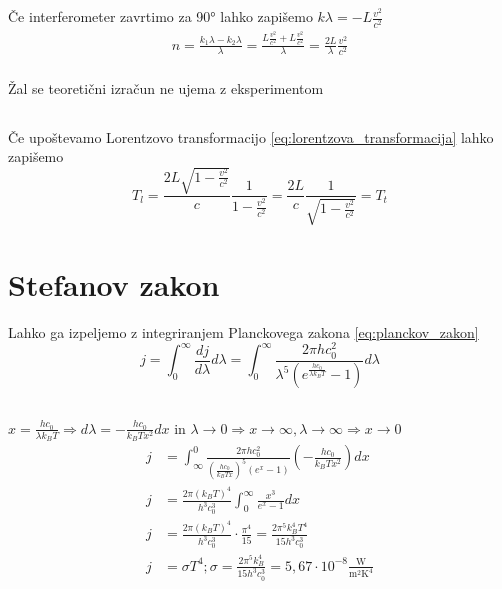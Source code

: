 \documentclass[a4paper,12pt]{article}
\begin{document}
\subsection{}
Če interferometer zavrtimo za 90° lahko zapišemo $k \lambda = -L \frac{v^2}{c^2}$
\begin{align}
    n = \frac{k_1\lambda - k_2\lambda}{\lambda} = \frac{L \frac{v^2}{c^2} + L \frac{v^2}{c^2}}{\lambda} = \frac{2 L}{\lambda} \frac{v^2}{c^2} \\
\end{align}

Žal se teoretični izračun ne ujema z eksperimentom

\subsection{}
Če upoštevamo Lorentzovo transformacijo \ref{eq:lorentzova_transformacija} lahko zapišemo
\begin{equation}
    T_l = \frac{2L\sqrt{1 - \frac{v^2}{c^2}}}{c} \frac{1}{1 - \frac{v^2}{c^2}} = \frac{2L}{c} \frac{1}{\sqrt{1 - \frac{v^2}{c^2}}} = T_t
\end{equation}

\newpage
\section{Stefanov zakon}
Lahko ga izpeljemo z integriranjem Planckovega zakona \ref{eq:planckov_zakon}
\begin{equation}
    j = \int_0^\infty \frac{dj}{d\lambda} d\lambda = \int_0^\infty \frac{2 \pi hc_0^2}{\lambda^5\left(e^{\frac{hc_0}{\lambda k_B T}} - 1\right)} d\lambda
\end{equation}

\subsection{}
$x = \frac{hc_0}{\lambda k_B T} \Rightarrow d\lambda = -\frac{hc_0}{k_B T x^2} dx$ in $\lambda  \to 0 \Rightarrow x \to \infty, \lambda \to \infty \Rightarrow x \to 0$
\begin{align}
    j & = \int_\infty^0 \frac{2 \pi hc_0^2}{\left(\frac{hc_0}{k_B T x}\right)^5 \left(e^x - 1\right)} \left(-\frac{hc_0}{k_B T x^2}\right) dx \\
    j & = \frac{2 \pi (k_B T)^4}{h^3 c_0^3} \int_0^\infty \frac{x^3}{e^x - 1} dx                                                              \\
    j & = \frac{2 \pi (k_B T)^4}{h^3 c_0^3} \cdot \frac{\pi^4}{15} = \frac{2 \pi^5 k_B^4 T^4}{15 h^3 c_0^3}                                   \\
    j & = \sigma T^4; \sigma = \frac{2 \pi^5 k_B^4}{15 h^3 c_0^3} = 5,67 \cdot 10^{-8} \frac{\text{W}}{\text{m}^2 \text{K}^4}
\end{align}
\end{document}
